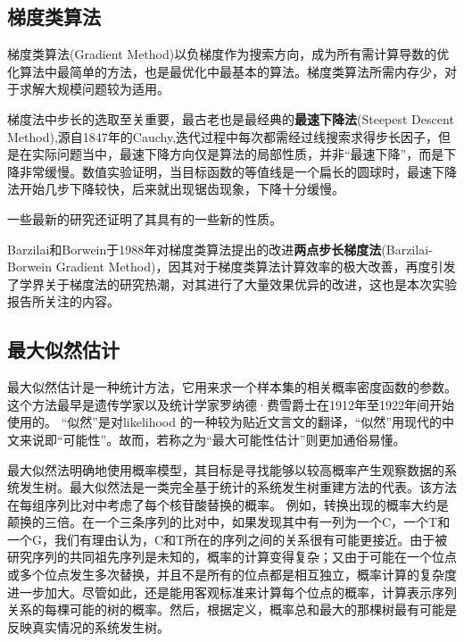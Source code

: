 \subsection{梯度类算法}

梯度类算法(Gradient Method)以负梯度作为搜索方向，成为所有需计算导数的优化算法中最简单的方法，也是最优化中最基本的算法。梯度类算法所需内存少，对于求解大规模问题较为适用。

梯度法中步长的选取至关重要，最古老也是最经典的\textbf{最速下降法}(Steepest Descent Method),源自1847年的Cauchy\cite{cauchy1847methode},迭代过程中每次都需经过线搜索求得步长因子，但是在实际问题当中，最速下降方向仅是算法的局部性质，并非“最速下降”，而是下降非常缓慢。数值实验证明，当目标函数的等值线是一个扁长的圆球时，最速下降法开始几步下降较快，后来就出现锯齿现象，下降十分缓慢\cite{akaike1959successive,forsythe1968asymptotic}。

一些最新的研究\cite{de2013spectral,nocedal2002behavior}还证明了其具有的一些新的性质。

Barzilai和Borwein\cite{barzilai1988two}于1988年对梯度类算法提出的改进\textbf{两点步长梯度法}(Barzilai-Borwein Gradient Method)，因其对于梯度类算法计算效率的极大改善，再度引发了学界关于梯度法的研究热潮，对其进行了大量效果优异的改进，这也是本次实验报告所关注的内容。

\subsection{最大似然估计}
最大似然估计是一种统计方法，它用来求一个样本集的相关概率密度函数的参数。这个方法最早是遗传学家以及统计学家罗纳德·费雪爵士在1912年至1922年间开始使用的。
“似然”是对likelihood 的一种较为贴近文言文的翻译，“似然”用现代的中文来说即“可能性”。故而，若称之为“最大可能性估计”则更加通俗易懂。

{\hanyi 最大似然法明确地使用概率模型，其目标是寻找能够以较高概率产生观察数据的系统发生树。最大似然法是一类完全基于统计的系统发生树重建方法的代表。该方法在每组序列比对中考虑了每个核苷酸替换的概率。}
例如，转换出现的概率大约是颠换的三倍。在一个三条序列的比对中，如果发现其中有一列为一个C，一个T和一个G，我们有理由认为，C和T所在的序列之间的关系很有可能更接近。由于被研究序列的共同祖先序列是未知的，概率的计算变得复杂；又由于可能在一个位点或多个位点发生多次替换，并且不是所有的位点都是相互独立，概率计算的复杂度进一步加大。尽管如此，还是能用客观标准来计算每个位点的概率，计算表示序列关系的每棵可能的树的概率。然后，根据定义，概率总和最大的那棵树最有可能是反映真实情况的系统发生树。

